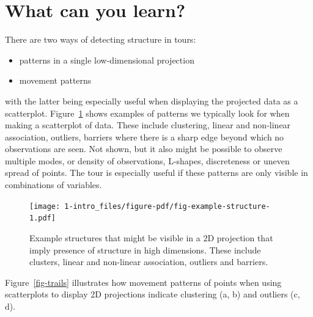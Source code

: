 \documentclass[
  letterpaper,
]{krantz}
\providecommand{\tightlist}{%
  \setlength{\itemsep}{0pt}\setlength{\parskip}{0pt}}\usepackage{longtable,booktabs,array}
\begin{document}
\hypertarget{what-can-you-learn}{%
\section{What can you learn?}\label{what-can-you-learn}}

There are two ways of detecting structure in tours:

\begin{itemize}
\tightlist
\item
  patterns in a single low-dimensional projection
\item
  movement patterns
\end{itemize}

with the latter being especially useful when displaying the projected
data as a scatterplot. Figure~\ref{fig-example-structure} shows examples
of patterns we typically look for when making a scatterplot of data.
These include clustering, linear and non-linear association, outliers,
barriers where there is a sharp edge beyond which no observations are
seen. Not shown, but it also might be possible to observe multiple
modes, or density of observations, L-shapes, discreteness or uneven
spread of points. The tour is especially useful if these patterns are
only visible in combinations of variables.

\begin{figure}

{\centering \texttt{[image: 1-intro\_files/figure-pdf/fig-example-structure-1.pdf]}

}

\caption{\label{fig-example-structure}Example structures that might be
visible in a 2D projection that imply presence of structure in high
dimensions. These include clusters, linear and non-linear association,
outliers and barriers.}

\end{figure}

Figure~\ref{fig-trails} illustrates how movement patterns of points when
using scatterplots to display 2D projections indicate clustering (a, b)
and outliers (c, d).
\end{document}
